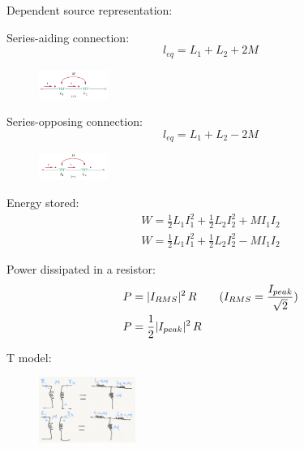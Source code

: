 \documentclass[a4paper]{article}
\begin{document}
\begin{multicols}{3}
Dependent source representation:

\begin{figure}[H]
    \centering
    \qquad
    \label{fig:example}%
\end{figure}

Series-aiding connection:
$$l_{eq}=L_1+L_2+2M$$

\begin{figure}[H] 
	\centering
	\includegraphics[width = 0.2\textwidth]{5}
	\label{fig:1}
\end{figure}

Series-opposing connection:
$$l_{eq}=L_1+L_2-2M$$

\begin{figure}[H] 
	\centering
	\includegraphics[width = 0.2\textwidth]{6}
	\label{fig:1}
\end{figure}


Energy stored:
\begin{align*}
W = \frac{1}{2}L_1 I_1^2 + \frac{1}{2}L_2 I_2^2 + MI_1 I_2 \tag{two currents enter the dots or leave}\\
W = \frac{1}{2}L_1 I_1^2 + \frac{1}{2}L_2 I_2^2 - MI_1 I_2 \tag{one enters, one leaves}
\end{align*}

Power dissipated in a resistor:
\begin{align*}
P &= |I_{RMS}|^2 \, R \tag{$I_{RMS} = \dfrac{I_{peak}}{\sqrt{2}}$}\\
P &= \frac{1}{2}|I_{peak}|^2 \, R
\end{align*} 


T model:
\begin{figure}[H] 
	\centering
	\includegraphics[width = 0.28\textwidth]{T}
	\label{fig:1}
\end{figure}


\end{multicols}
\end{document}
